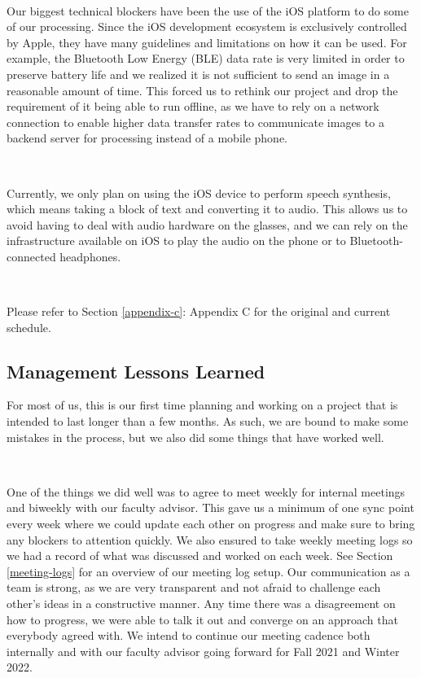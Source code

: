 \documentclass[a4paper,11pt]{article}
\begin{document}
\

\noindent
Our biggest technical blockers have been the use of the iOS platform to do some of our processing. Since the iOS development ecosystem is exclusively controlled by Apple, they have many guidelines and limitations on how it can be used. For example, the Bluetooth Low Energy (BLE) data rate is very limited in order to preserve battery life and we realized it is not sufficient to send an image in a reasonable amount of time. This forced us to rethink our project and drop the requirement of it being able to run offline, as we have to rely on a network connection to enable higher data transfer rates to communicate images to a backend server for processing instead of a mobile phone.

\

\noindent
Currently, we only plan on using the iOS device to perform speech synthesis, which means taking a block of text and converting it to audio. This allows us to avoid having to deal with audio hardware on the glasses, and we can rely on the infrastructure available on iOS to play the audio on the phone or to Bluetooth-connected headphones.

\ 

\noindent
Please refer to Section \ref{appendix-c}: Appendix C for the original and current schedule.

\subsection{Management Lessons Learned}
For most of us, this is our first time planning and working on a project that is intended to last longer than a few months. As such, we are bound to make some mistakes in the process, but we also did some things that have worked well.

\

\noindent
One of the things we did well was to agree to meet weekly for internal meetings and biweekly with our faculty advisor. This gave us a minimum of one sync point every week where we could update each other on progress and make sure to bring any blockers to attention quickly. We also ensured to take weekly meeting logs so we had a record of what was discussed and worked on each week. See Section \ref{meeting-logs} for an overview of our meeting log setup. Our communication as a team is strong, as we are very transparent and not afraid to challenge each other's ideas in a constructive manner. Any time there was a disagreement on how to progress, we were able to talk it out and converge on an approach that everybody agreed with. We intend to continue our meeting cadence both internally and with our faculty advisor going forward for Fall 2021 and Winter 2022.
\end{document}
